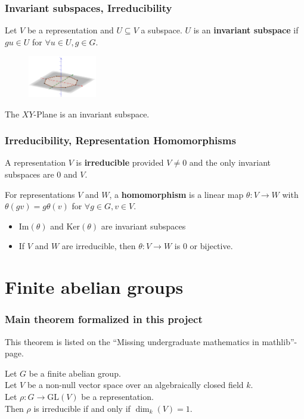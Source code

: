 \documentclass{beamer}
\newcommand{\GL}{\text{GL}}
\newcommand{\Img}{\text{Im}}
\newcommand{\Ker}{\text{Ker}}
\begin{document}
\begin{frame}
\frametitle{Invariant subspaces, Irreducibility}
\begin{definition}
Let \(V\) be a representation and \(U \subseteq V\) a subspace. \(U\) is an \textbf{invariant subspace} if \(gu \in U\) for \(\forall u\in U, g \in G\).
\end{definition}
\pause
\begin{example}
\begin{figure}[h]
\begin{center}
\includegraphics[width = 3cm]{images/octagon.png}
\end{center}
\end{figure}
\pause
The \(XY\)-Plane is an invariant subspace.
\end{example}
\end{frame}

\begin{frame}
\frametitle{Irreducibility, Representation Homomorphisms}
\begin{definition}
A representation \(V\) is \textbf{irreducible} provided \(V \neq 0\) and the only invariant subspaces are 0 and \(V\).
\end{definition}
\pause
\begin{definition}
For representations \(V\) and \(W\), a \textbf{homomorphism} is a linear map \(\theta: V\to W\) with \(\theta(gv) = g\theta(v)\) for \(\forall g\in G, v\in V\).
\end{definition}
\pause
\begin{itemize}
\item \(\Img (\theta)\) and \(\Ker (\theta)\) are invariant subspaces
\item If \(V\) and \(W\) are irreducible, then \(\theta: V \to W\) is 0 or bijective.
\end{itemize}
\end{frame}

\section{Finite abelian groups}
\begin{frame}
\frametitle{Main theorem formalized in this project}
This theorem is listed on the \enquote{Missing undergraduate mathematics in mathlib}-page.
\pause
\begin{theorem}
Let \(G\) be a finite abelian group.\\
Let \(V\) be a non-null vector space over an algebraically closed field \(k\).\\
Let \(\rho: G \to \GL (V)\) be a representation.\\
\pause
\vspace{1cm}
Then \(\rho\) is irreducible if and only if \(\dim_k(V) = 1\).
\end{theorem}
\end{frame}
\end{document}
